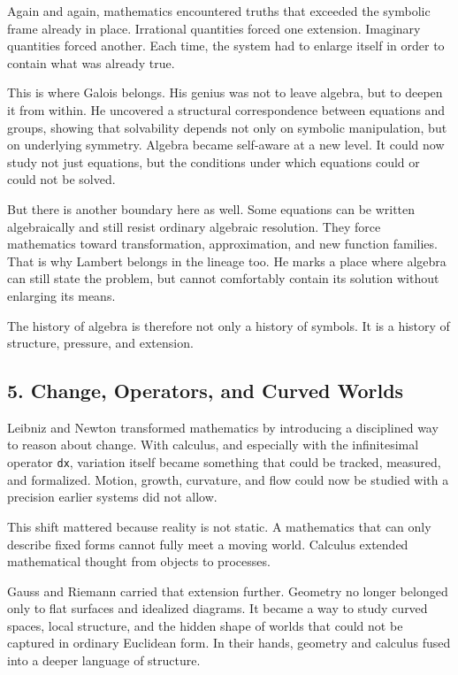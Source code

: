 Again and again, mathematics encountered truths that exceeded the
symbolic frame already in place. Irrational quantities forced one
extension. Imaginary quantities forced another. Each time, the system
had to enlarge itself in order to contain what was already true.

This is where Galois belongs. His genius was not to leave algebra, but
to deepen it from within. He uncovered a structural correspondence
between equations and groups, showing that solvability depends not only
on symbolic manipulation, but on underlying symmetry. Algebra became
self-aware at a new level. It could now study not just equations, but
the conditions under which equations could or could not be solved.

But there is another boundary here as well. Some equations can be
written algebraically and still resist ordinary algebraic resolution.
They force mathematics toward transformation, approximation, and new
function families. That is why Lambert belongs in the lineage too. He
marks a place where algebra can still state the problem, but cannot
comfortably contain its solution without enlarging its means.

The history of algebra is therefore not only a history of symbols. It is
a history of structure, pressure, and extension.

\hypertarget{change-operators-and-curved-worlds}{%
\subsection{5. Change, Operators, and Curved
Worlds}\label{change-operators-and-curved-worlds}}

Leibniz and Newton transformed mathematics by introducing a disciplined
way to reason about change. With calculus, and especially with the
infinitesimal operator \texttt{dx}, variation itself became something
that could be tracked, measured, and formalized. Motion, growth,
curvature, and flow could now be studied with a precision earlier
systems did not allow.

This shift mattered because reality is not static. A mathematics that
can only describe fixed forms cannot fully meet a moving world. Calculus
extended mathematical thought from objects to processes.

Gauss and Riemann carried that extension further. Geometry no longer
belonged only to flat surfaces and idealized diagrams. It became a way
to study curved spaces, local structure, and the hidden shape of worlds
that could not be captured in ordinary Euclidean form. In their hands,
geometry and calculus fused into a deeper language of structure.

